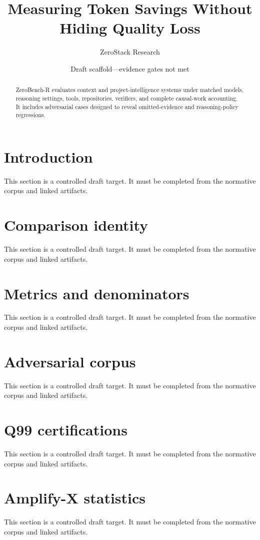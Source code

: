 \documentclass[11pt]{article}
\title{Measuring Token Savings Without Hiding Quality Loss}
\author{ZeroStack Research}
\date{Draft scaffold---evidence gates not met}
\begin{document}
\maketitle
\begin{abstract}
ZeroBench-R evaluates context and project-intelligence systems under matched models, reasoning settings, tools, repositories, verifiers, and complete causal-work accounting. It includes adversarial cases designed to reveal omitted-evidence and reasoning-policy regressions.
\end{abstract}
\tableofcontents
\section{Introduction}
This section is a controlled draft target. It must be completed from the normative corpus and linked artifacts.

\section{Comparison identity}
This section is a controlled draft target. It must be completed from the normative corpus and linked artifacts.

\section{Metrics and denominators}
This section is a controlled draft target. It must be completed from the normative corpus and linked artifacts.

\section{Adversarial corpus}
This section is a controlled draft target. It must be completed from the normative corpus and linked artifacts.

\section{Q99 certifications}
This section is a controlled draft target. It must be completed from the normative corpus and linked artifacts.

\section{Amplify-X statistics}
This section is a controlled draft target. It must be completed from the normative corpus and linked artifacts.
\end{document}
